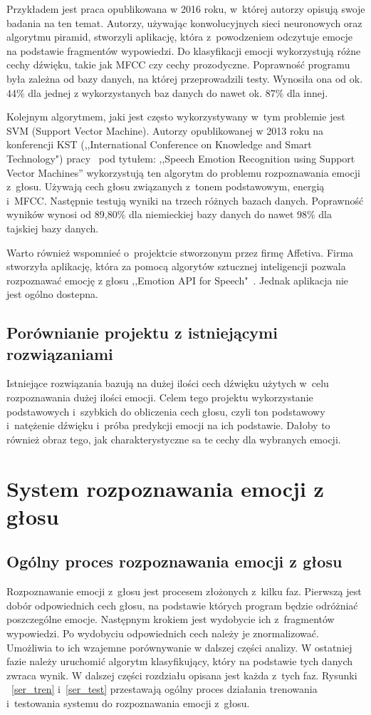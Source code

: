 \documentclass[declaration,shortabstract]{iithesis}
\begin{document}
Przykładem jest praca\cite{sernn} opublikowana w 2016 roku, w~której autorzy opisują swoje badania na ten temat. Autorzy, używając konwolucyjnych sieci neuronowych oraz algorytmu piramid, stworzyli aplikację, która z~powodzeniem odczytuje emocje na podstawie fragmentów wypowiedzi. Do klasyfikacji emocji wykorzystują różne cechy dźwięku, takie jak MFCC czy cechy prozodyczne. Poprawność programu była zależna od bazy danych, na której przeprowadzili testy. Wynosiła ona od ok. 44\% dla jednej z wykorzystanych baz danych do nawet ok. 87\% dla innej.

Kolejnym algorytmem, jaki jest często wykorzystywany w~tym problemie jest SVM (Support Vector Machine). Autorzy opublikowanej w 2013 roku na konferencji KST (,,International Conference on Knowledge and Smart Technology") pracy~\cite{svn} pod tytułem: ,,Speech Emotion Recognition using Support Vector Machines” wykorzystują ten algorytm do problemu rozpoznawania emocji z~głosu. Używają cech głosu związanych z~tonem podstawowym, energią i~MFCC. Następnie testują wyniki na trzech różnych bazach danych. Poprawność wyników wynosi od 89,80\% dla niemieckiej bazy danych do nawet 98\% dla tajskiej bazy danych.

Warto również wspomnieć o~projektcie stworzonym przez firmę Affetiva. Firma stworzyła aplikację, która za pomocą algorytów sztucznej inteligencji pozwala rozpoznawać emocję z głosu ,,Emotion API for Speech"~\cite{emo_api_speech}. Jednak aplikacja nie jest ogólno dostepna.

\section{Porównianie projektu z istniejącymi rozwiązaniami}
Istniejące rozwiązania bazują na dużej ilości cech dźwięku użytych w~celu rozpoznawania dużej ilości emocji.
Celem tego projektu wykorzystanie podstawowych i~szybkich do obliczenia cech głosu, czyli ton podstawowy i~natężenie dźwięku i~próba predykcji emocji na ich podstawie. Dałoby to również obraz tego, jak charakterystyczne sa te cechy dla wybranych emocji.

\let\cleardoublepage\clearpage
\chapter{System rozpoznawania emocji z głosu}
\section{Ogólny proces rozpoznawania emocji z głosu}
Rozpoznawanie emocji z~głosu jest procesem złożonych z~kilku faz.
Pierwszą jest dobór odpowiednich cech głosu, na podstawie których program będzie odróżniać poszczególne emocje. Następnym krokiem jest wydobycie ich z~fragmentów wypowiedzi. Po wydobyciu odpowiednich cech należy je znormalizować. Umożliwia to ich wzajemne porównywanie w dalszej części analizy. W ostatniej fazie należy uruchomić algorytm klasyfikujący, który na podstawie tych danych zwraca wynik.
W dalszej części rozdziału opisana jest każda z~tych faz. Rysunki ~\ref{ser_tren} i~\ref{ser_test} przestawają ogólny proces działania trenowania i~testowania systemu do rozpoznawania emocji z~głosu.
\end{document}
